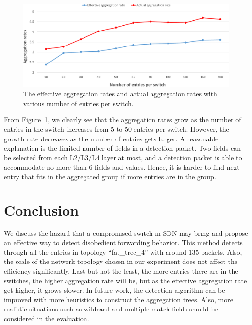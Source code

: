 \documentclass[conference]{IEEEtran}
\begin{document}
\begin{figure}[ht]
\centering
\includegraphics[width=1\linewidth]{figures/exp_entrynum_trend.pdf}
\caption{The effective aggregation rates and actual aggregation rates with various number of entries per switch.}
\label{exp_entrynum_trend}
\end{figure}

From Figure~\ref{exp_entrynum_trend}, we clearly see that the aggregation rates grow as the number of entries in the switch increases from 5 to 50 entries per switch. However, the growth rate decreases as the number of entries gets larger. A reasonable explanation is the limited number of fields in a detection packet. Two fields can be selected from each L2/L3/L4 layer at most, and a detection packet is able to accommodate no more than 6 fields and values. Hence, it is harder to find next entry that fits in the aggregated group if more entries are in the group.

\section{Conclusion}
\label{conclusion}
We discuss the hazard that a compromised switch in SDN may bring and propose an effective way to detect disobedient forwarding behavior. This method detects through all the entries in topology ``fat\_tree\_4'' with around 135 packets. Also, the scale of the network topology chosen in our experiment does not affect the efficiency significantly. Last but not the least, the more entries there are in the switches, the higher aggregation rate will be, but as the effective aggregation rate get higher, it grows slower. In future work, the detection algorithm can be improved with more heuristics to construct the aggregation trees. Also, more realistic situations such as wildcard and multiple match fields should be considered in the evaluation.

\end{document}
